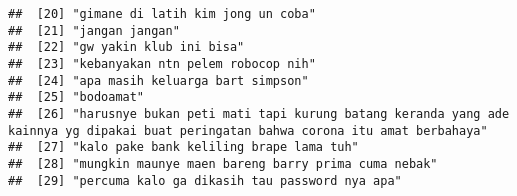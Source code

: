 \documentclass[
]{article}
\begin{document}
\begin{verbatim}
##  [20] "gimane di latih kim jong un coba"                                                                                                                                                                                                                                                  
##  [21] "jangan jangan"                                                                                                                                                                                                                                                                     
##  [22] "gw yakin klub ini bisa"                                                                                                                                                                                                                                                            
##  [23] "kebanyakan ntn pelem robocop nih"                                                                                                                                                                                                                                                  
##  [24] "apa masih keluarga bart simpson"                                                                                                                                                                                                                                                   
##  [25] "bodoamat"                                                                                                                                                                                                                                                                          
##  [26] "harusnye bukan peti mati tapi kurung batang keranda yang ade kainnya yg dipakai buat peringatan bahwa corona itu amat berbahaya"                                                                                                                                                   
##  [27] "kalo pake bank keliling brape lama tuh"                                                                                                                                                                                                                                            
##  [28] "mungkin maunye maen bareng barry prima cuma nebak"                                                                                                                                                                                                                                 
##  [29] "percuma kalo ga dikasih tau password nya apa"                                                                                                                                                                                                                                      

\end{verbatim}
\end{document}

